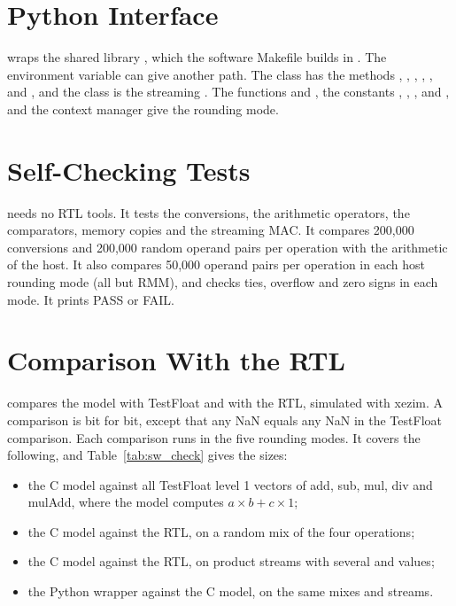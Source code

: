 \section{Python Interface}
\label{sec:sw_py}

 wraps the shared library , which the
software Makefile builds in . The environment variable
 can give another path. The class  has the methods
, , , , , 
and , and the class  is the streaming . The functions
 and , the constants , ,
,  and , and the context manager  give the
rounding mode.

\section{Self-Checking Tests}
\label{sec:sw_tests}

 needs no RTL tools. It tests the conversions, the
arithmetic operators, the comparators, memory copies and the streaming MAC. It
compares 200,000 conversions and 200,000 random operand pairs per operation with
the  arithmetic of the host. It also compares 50,000 operand pairs per
operation in each host rounding mode (all but RMM), and checks ties, overflow and
zero signs in each mode. It prints PASS or FAIL.

\section{Comparison With the RTL}
\label{sec:sw_check}

 compares the model with TestFloat and with the RTL, simulated
with xezim. A comparison is bit for bit, except that any NaN equals any
NaN in the TestFloat comparison. Each comparison runs in the five rounding modes.
It covers the following, and Table~\ref{tab:sw_check} gives the sizes:

\begin{itemize}
\item the C model against all TestFloat level 1 vectors of add, sub, mul, div and
  mulAdd, where the  model computes $a \times b + c \times 1$;
\item the C model against the  RTL, on a random mix of the four operations;
\item the C model against the  RTL, on product streams with several
   and  values;
\item the Python wrapper against the C model, on the same mixes and streams.
\end{itemize}

